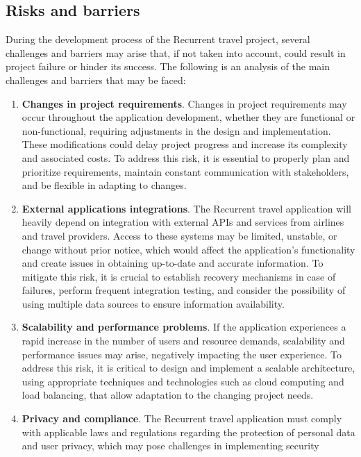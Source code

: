 \documentclass[../memory.tex]{subfiles}
\begin{document}
\subsection{Risks and barriers}
During the development process of the Recurrent travel project, several
challenges and barriers may arise that, if not taken into account, could result
in project failure or hinder its success. The following is an analysis of the
main challenges and barriers that may be faced:
\begin{enumerate}
	\item \textbf{Changes in project requirements}. Changes in project requirements may
	      occur throughout the application development, whether they are functional
	      or non-functional, requiring adjustments in the design and implementation.
	      These modifications could delay project progress and increase its
	      complexity and associated costs. To address this risk, it is essential to
	      properly plan and prioritize requirements, maintain constant communication
	      with stakeholders, and be flexible in adapting to changes.
	\item \textbf{External applications integrations}. The Recurrent travel application
	      will heavily depend on integration with external APIs and services from
	      airlines and travel providers. Access to these systems may be limited,
	      unstable, or change without prior notice, which would affect the
	      application's functionality and create issues in obtaining up-to-date and
	      accurate information. To mitigate this risk, it is crucial to establish
	      recovery mechanisms in case of failures, perform frequent integration
	      testing, and consider the possibility of using multiple data sources to
	      ensure information availability.
	\item \textbf{Scalability and performance problems}. If the application experiences a
	      rapid increase in the number of users and resource demands, scalability
	      and performance issues may arise, negatively impacting the user
	      experience. To address this risk, it is critical to design and implement a
	      scalable architecture, using appropriate techniques and technologies such
	      as cloud computing and load balancing, that allow adaptation to the
	      changing project needs.
	\item \textbf{Privacy and compliance}. The Recurrent travel application must comply
	      with applicable laws and regulations regarding the protection of personal
	      data and user privacy, which may pose challenges in implementing security

\end{enumerate}
\end{document}
